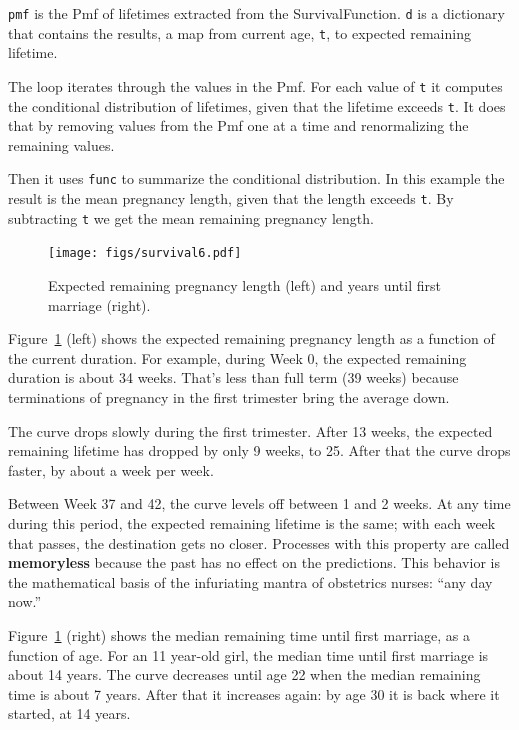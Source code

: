 \documentclass[12pt]{book}
\theoremstyle{exercise}
\begin{document}
{\tt pmf} is the Pmf of lifetimes extracted from the SurvivalFunction.
{\tt d} is a dictionary that contains the results, a map from
current age, {\tt t}, to expected remaining lifetime.%

The loop iterates through the values in the Pmf.  For each value
of {\tt t} it computes the conditional distribution of lifetimes,
given that the lifetime exceeds {\tt t}.  It does that by removing
values from the Pmf one at a time and renormalizing the remaining
values.

Then it uses {\tt func} to summarize the conditional distribution.
In this example the result is the mean pregnancy length, given that
the length exceeds {\tt t}.  By subtracting {\tt t} we get the
mean remaining pregnancy length.%

\begin{figure}
\centerline{\texttt{[image: figs/survival6.pdf]}}
\caption{Expected remaining pregnancy length (left) and
years until first marriage (right).}%
\label{survival6}
\end{figure}

Figure~\ref{survival6} (left) shows the expected remaining pregnancy
length as a function of the current duration.  For example, during
Week 0, the expected remaining duration is about 34 weeks.  That's
less than full term (39 weeks) because terminations of pregnancy
in the first trimester bring the average down.%

The curve drops slowly during the first trimester.  After 13 weeks,
the expected remaining lifetime has dropped by only 9 weeks, to
25.  After that the curve drops faster, by about a week per week.

Between Week 37 and 42, the curve levels off between 1 and 2 weeks.
At any time during this period, the expected remaining lifetime is the
same; with each week that passes, the destination gets no closer.
Processes with this property are called {\bf memoryless} because
the past has no effect on the predictions.
This behavior is the mathematical basis of the infuriating mantra
of obstetrics nurses: ``any day now.''%

Figure~\ref{survival6} (right) shows the median remaining time until
first marriage, as a function of age.  For an 11 year-old girl, the
median time until first marriage is about 14 years.  The curve decreases
until age 22 when the median remaining time is about 7 years.
After that it increases again: by age 30 it is back where it started,
at 14 years.
\end{document}
